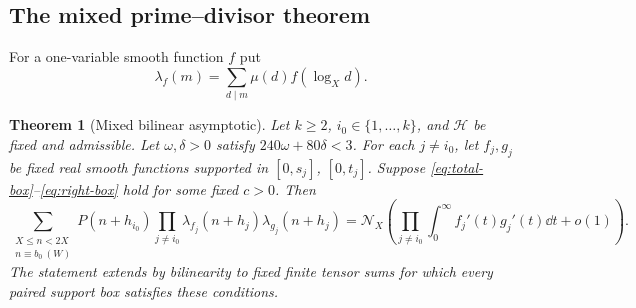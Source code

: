 \documentclass[11pt,a4paper]{article}
\newtheorem{theorem}{Theorem}[section]
\theoremstyle{definition}\newtheorem{definition}[theorem]{Definition}
\theoremstyle{remark}\newtheorem{remark}[theorem]{Remark}
\numberwithin{equation}{section}
\begin{document}
\subsection{The mixed prime--divisor theorem}
For a one-variable smooth function $f$ put
\[
 \lambda_f(m)=\sum_{d\mid m}\mu(d)f(\log_Xd).
\]
\begin{theorem}[Mixed bilinear asymptotic]\label{thm:mixed}
Let $k\ge2$, $i_0\in\{1,\ldots,k\}$, and $\mathcal H$ be fixed and admissible. Let $\omega,\delta>0$ satisfy $240\omega+80\delta<3$. For each $j\ne i_0$, let $f_j,g_j$ be fixed real smooth functions supported in $[0,s_j]$, $[0,t_j]$. Suppose \eqref{eq:total-box}--\eqref{eq:right-box} hold for some fixed $c>0$. Then
\begin{equation}\label{eq:mixed}
 \sum_{\substack{X\le n<2X\\n\equiv b_0\ (W)}}
 P(n+h_{i_0})\prod_{j\ne i_0}
 \lambda_{f_j}(n+h_j)\lambda_{g_j}(n+h_j)
 =\mathcal N_X\left(\prod_{j\ne i_0}\int_0^\infty f_j'(t)g_j'(t)\dd t+o(1)\right).
\end{equation}
The statement extends by bilinearity to fixed finite tensor sums for which every paired support box satisfies these conditions.
\end{theorem}
\end{document}
